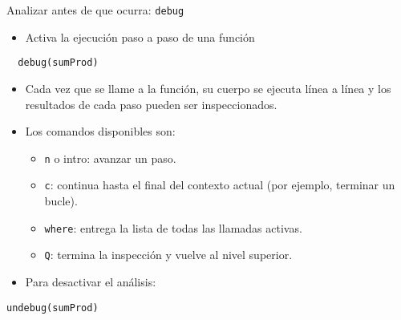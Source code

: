 \documentclass[xcolor={usenames,svgnames,dvipsnames}]{beamer}
\begin{document}
\begin{frame}[fragile,label={sec:orgheadline21}]{Analizar antes de que ocurra: \texttt{debug}}
 \begin{itemize}
\item Activa la ejecución paso a paso de una función
\end{itemize}
\lstset{language=R,label= ,caption= ,captionpos=b,numbers=none}
\begin{lstlisting}
  debug(sumProd)
\end{lstlisting}

\begin{itemize}
\item Cada vez que se llame a la función, su cuerpo se ejecuta línea a línea y los resultados de cada paso pueden ser inspeccionados.
\item Los comandos disponibles son:
\begin{itemize}
\item \texttt{n} o intro: avanzar un paso.
\item \texttt{c}: continua hasta el final del contexto actual (por ejemplo,
terminar un bucle).
\item \texttt{where}: entrega la lista de todas las llamadas activas.
\item \texttt{Q}: termina la inspección y vuelve al nivel superior.
\end{itemize}
\item Para desactivar el análisis:
\end{itemize}
\lstset{language=R,label= ,caption= ,captionpos=b,numbers=none}
\begin{lstlisting}
undebug(sumProd)
\end{lstlisting}
\end{frame}
\end{document}
